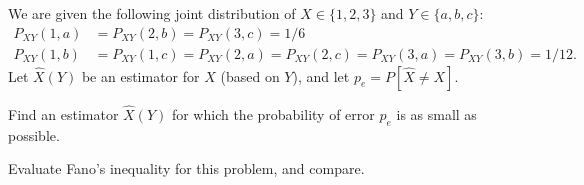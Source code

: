 \documentclass[a4paper,10pt,landscape,twocolumn]{scrartcl}
\begin{document}
\begin{exercise}[]
We are given the following joint distribution of $X \in \{1,2,3\}$ and $Y \in \{a,b,c\}$:
\begin{align*}
P_{XY}(1,a) &= P_{XY}(2,b) = P_{XY}(3,c) = 1/6\\
P_{XY}(1,b) &= P_{XY}(1,c) = P_{XY}(2,a) = P_{XY}(2,c) = P_{XY}(3,a) = P_{XY}(3,b) = 1/12.
\end{align*}
Let $\hat{X}(Y)$ be an estimator for $X$ (based on $Y$), and let $p_{e} = P[\hat{X} \neq X]$.
	\begin{subex}
	Find an estimator $\hat{X}(Y)$ for which the probability of error $p_e$ is as small as possible.
	\end{subex}
	\begin{subex}
	Evaluate Fano's inequality for this problem, and compare.
	\end{subex}
\end{exercise}
\end{document}
